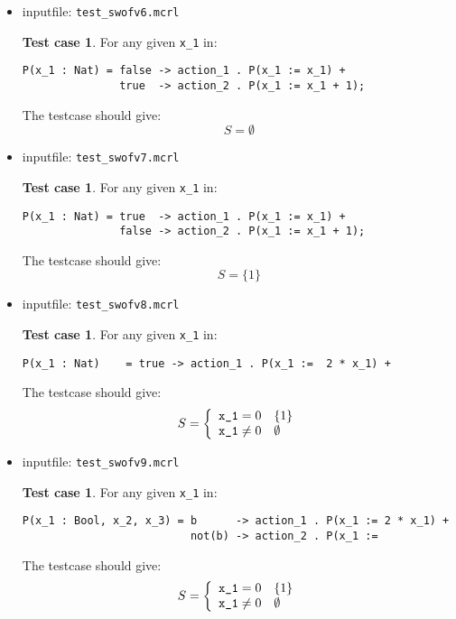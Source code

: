 \index{}\documentclass[a4paper,10pt]{article}
\theoremstyle{plain}
\theoremstyle{definition}
\newtheorem{tcase}[thmfs]{Test case}
\begin{document}
\begin{itemize}
\item inputfile: \verb"test_swofv6.mcrl" 
\begin{tcase}
For any given \verb"x_1" in:
\begin{verbatim}
P(x_1 : Nat) = false -> action_1 . P(x_1 := x_1) +
               true  -> action_2 . P(x_1 := x_1 + 1);
\end{verbatim}
The testcase should give:
$$ S = \emptyset $$
\end{tcase}

\item inputfile: \verb"test_swofv7.mcrl" 
\begin{tcase}
For any given \verb"x_1" in:
\begin{verbatim}
P(x_1 : Nat) = true  -> action_1 . P(x_1 := x_1) +
               false -> action_2 . P(x_1 := x_1 + 1);
\end{verbatim}
The testcase should give:
$$ S = \lbrace 1 \rbrace $$
\end{tcase}

\item inputfile: \verb"test_swofv8.mcrl" 
\begin{tcase}
For any given \verb"x_1" in:
\begin{verbatim}
P(x_1 : Nat)	= true -> action_1 . P(x_1 :=  2 * x_1) +
\end{verbatim}
The testcase should give:
\begin{displaymath}
    S = \left\{
        \begin{array}{l l}
            \verb"x_1" = 0                      & \lbrace 1 \rbrace \\
            \verb"x_1" \neq 0                   & \emptyset \\
        \end{array} \right.
\end{displaymath}
\end{tcase}

\item inputfile: \verb"test_swofv9.mcrl" 
\begin{tcase}
For any given \verb"x_1" in:
\begin{verbatim}
P(x_1 : Bool, x_2, x_3) = b      -> action_1 . P(x_1 := 2 * x_1) +
                          not(b) -> action_2 . P(x_1 :=  
\end{verbatim}
The testcase should give:
\begin{displaymath}
    S = \left\{
        \begin{array}{l l}
            \verb"x_1" = 0                      & \lbrace 1 \rbrace \\
            \verb"x_1" \neq 0                   & \emptyset \\
        \end{array} \right.
\end{displaymath}
\end{tcase}

\end{itemize}
\end{document}
